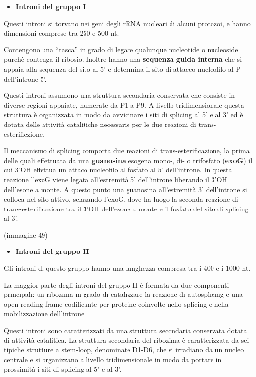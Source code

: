 \documentclass[11pt]{book}
\begin{document}
\begin{itemize}
\itemsep1pt\parskip0pt
\item
  \textbf{Introni del gruppo I}
\end{itemize}

Questi introni si torvano nei geni degli rRNA nucleari di alcuni
protozoi, e hanno dimensioni comprese tra 250 e 500 nt.

Contengono una ``tasca'' in grado di legare qualunque nucleotide o
nucleoside purchè contenga il ribosio. Inoltre hanno una
\textbf{sequenza guida interna} che si appaia alla sequenza del sito al
5' e determina il sito di attacco nucleofilo al P dell'introne 5'.

Questi introni assumono una struttura secondaria conservata che consiste
in diverse regioni appaiate, numerate da P1 a P9. A livello
tridimensionale questa struttura è organizzata in modo da avvicinare i
siti di splicing al 5' e al 3' ed è dotata delle attività catalitiche
necessarie per le due reazioni di trans-esterificzione.

Il meccanismo di splicing comporta due reazioni di
trans-esterificazione, la prima delle quali effettuata da una
\textbf{guanosina} esogena mono-, di- o trifosfato (\textbf{exoG}) il
cui 3'OH effettua un attaco nucleofilo al fosfato al 5' dell'introne. In
questa reazione l'exoG viene legata all'estremità 5' dell'introne
liberando il 3'OH dell'esone a monte. A questo punto una guanosina
all'estremità 3' dell'introne si colloca nel sito attivo, sclazando
l'exoG, dove ha luogo la seconda reazione di trans-esterificazione tra
il 3'OH dell'esone a monte e il fosfato del sito di splicing al 3'.

(immagine 49)

\begin{itemize}
\itemsep1pt\parskip0pt
\item
  \textbf{Introni del gruppo II}
\end{itemize}

Gli introni di questo gruppo hanno una lunghezza compresa tra i 400 e i
1000 nt.

La maggior parte degli introni del gruppo II è formata da due componenti
principali: un ribozima in grado di catalizzare la reazione di
autosplicing e una open reading frame codificante per proteine coinvolte
nello splicing e nella mobilizzazione dell'introne.

Questi introni sono caratterizzati da una struttura secondaria
conservata dotata di attività catalitica. La struttura secondaria del
ribozima è caratterizzata da sei tipiche strutture a stem-loop,
denominate D1-D6, che si irradiano da un nucleo centrale e si
organizzano a livello tridimensionale in modo da portare in prossimità i
siti di splicing al 5' e al 3'.
\end{document}
